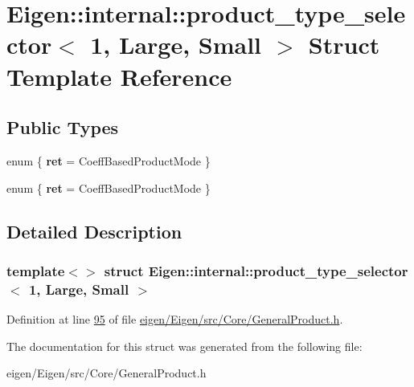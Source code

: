 \hypertarget{struct_eigen_1_1internal_1_1product__type__selector_3_011_00_01_large_00_01_small_01_4}{}\section{Eigen\+:\+:internal\+:\+:product\+\_\+type\+\_\+selector$<$ 1, Large, Small $>$ Struct Template Reference}
\label{struct_eigen_1_1internal_1_1product__type__selector_3_011_00_01_large_00_01_small_01_4}
\subsection*{Public Types}
\begin{DoxyCompactItemize}
\item 
\mbox{\label{struct_eigen_1_1internal_1_1product__type__selector_3_011_00_01_large_00_01_small_01_4_afef3cc7153d2fa877a013629a24e8b47}} 
enum \{ {\bfseries ret} = Coeff\+Based\+Product\+Mode
 \}
\item 
\mbox{\label{struct_eigen_1_1internal_1_1product__type__selector_3_011_00_01_large_00_01_small_01_4_a39b7af1eb124628d895a4177f3b8209a}} 
enum \{ {\bfseries ret} = Coeff\+Based\+Product\+Mode
 \}
\end{DoxyCompactItemize}


\subsection{Detailed Description}
\subsubsection*{template$<$$>$\newline
struct Eigen\+::internal\+::product\+\_\+type\+\_\+selector$<$ 1, Large, Small $>$}



Definition at line \hyperlink{eigen_2_eigen_2src_2_core_2_general_product_8h_source_l00095}{95} of file \hyperlink{eigen_2_eigen_2src_2_core_2_general_product_8h_source}{eigen/\+Eigen/src/\+Core/\+General\+Product.\+h}.



The documentation for this struct was generated from the following file\+:\begin{DoxyCompactItemize}
\item 
eigen/\+Eigen/src/\+Core/\+General\+Product.\+h\end{DoxyCompactItemize}
